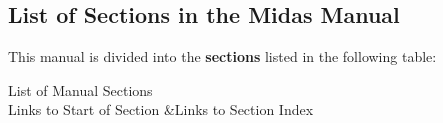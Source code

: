  \par
\par
\hypertarget{Organization_O_what}{}\subsection{List of Sections in the Midas Manual}\label{Organization_O_what}
This manual is divided into the {\bfseries sections} listed in the following table:

\label{Organization_Organization_section_index}
\hypertarget{Organization_Organization_section_index}{}


\begin{TabularC}{2}
\hline
List of Manual Sections  \\
Links to Start of Section &Links to Section Index  \\


\end{TabularC}

